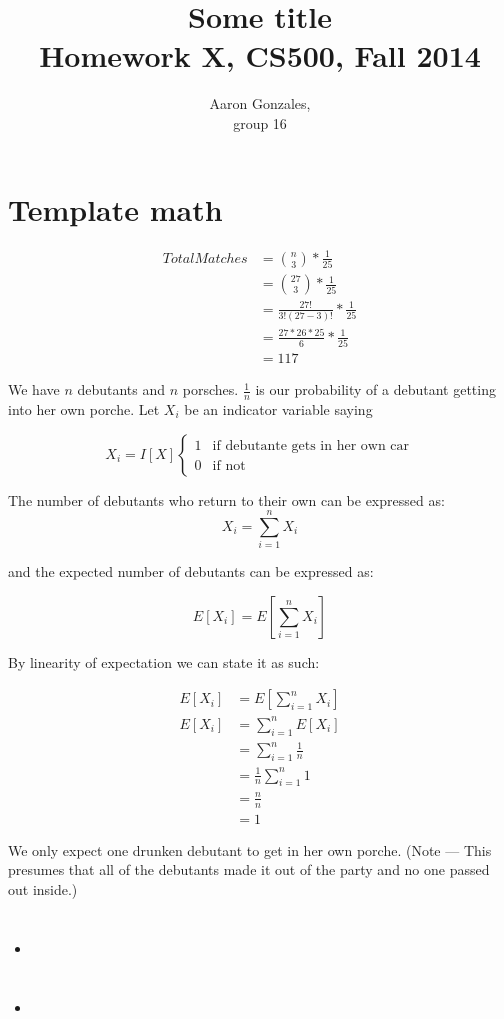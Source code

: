 \documentclass[titlepage]{article}
\begin{document}
\title{Some title\\ Homework X, CS500, Fall 2014}
\author{Aaron Gonzales, \\ group 16}
\maketitle


\section{Template math}
\begin{align*}
	Total Matches &={n \choose 3} * \frac{1}{25} \\
					&= {27 \choose 3}   * \frac{1}{25} \\
					&=   \frac{27!}{3!(27-3)!} * \frac{1}{25} \\
					&= \frac{27 * 26 * 25}{6} * \frac{1}{25}  \\
					&= 117
\end{align*}


We have $n$ debutants and $n$ porsches. 
$\frac{1}{n}$ is our probability of a debutant getting into her own porche.
Let $X_i$ be an indicator variable saying 

\[
	X_i = I[X]
	\begin{cases}
		1 & \text{if debutante gets in her own car} \\
		0 & \text{if not} 
	\end{cases}
\]

The number of debutants who return to their own can be expressed as:
\[ X_i = \sum_{i=1}^n X_i \]

and the expected number of debutants can be expressed as:

\[ E [X_i] = E \left[ \sum_{i=1}^n X_i \right] \]

By linearity of expectation we can state it as such:

\begin{align*}
	E [X_i] &= E \left[ \sum_{i=1}^n X_i \right] \\
	E [X_i] &=  \sum_{i=1}^n E[X_i] \\ 
	&=  \sum_{i=1}^n \frac{1}{n} \\ 
	&=  \frac{1}{n} \sum_{i=1}^n 1 \\
	&= \frac{n}{n} \\
	& = 1
\end{align*}

We only expect one drunken debutant to get in her own porche. (Note --- This presumes
that all of the debutants made it out of the party and no one passed out
inside.)


\section{}
\begin{quote}
  \textbf{}
\end{quote}

\begin{itemize}
  \item \textbf{}
  \item \textbf{}
\end{itemize}
\end{document}
